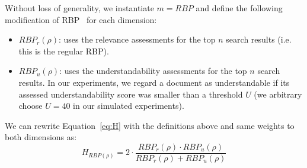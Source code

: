 %
Without loss of generality, we instantiate $m = RBP$ and define the following modification of RBP~\cite{moffat08} for each dimension:
%
\begin{itemize}[leftmargin=*]
	\item $RBP_r(\rho)$: uses the relevance assessments for the top $n$ search results (i.e. this is the regular RBP). 
%	
    \item $RBP_u(\rho)$: uses the understandability assessments for the top $n$ search results. In our experiments, we regard a document as understandable if its assessed understandability score was smaller than a threshold $U$ (we arbitrary choose $U = 40$ in our simulated experiments).
\end{itemize}

We can rewrite Equation~\ref{eq:H} with the definitions above and same weights to both dimensions as:
%
\begin{equation}
 H_{RBP(\rho)} = 2 \cdot \frac{RBP_r(\rho) \cdot RBP_u(\rho)}{RBP_r(\rho) + RBP_u(\rho)}
\label{eq:Hrbp}
\end{equation}





